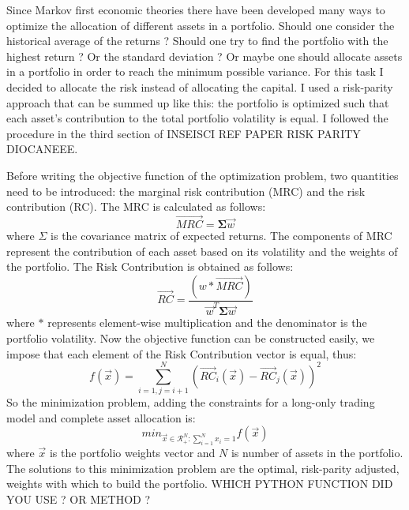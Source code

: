 Since Markov first economic theories there have been developed many ways to optimize the allocation of different assets in a portfolio. Should one consider the historical average of the returns ? Should one try to find the portfolio with the highest return ? Or the standard deviation ? Or maybe one should allocate assets in a portfolio in order to reach the minimum possible variance. For this task I decided to allocate the risk instead of allocating the capital. I used a risk-parity approach that can be summed up like this: the portfolio is optimized such that each asset's contribution to the total portfolio volatility is equal. I followed the procedure in the third section of INSEISCI REF PAPER RISK PARITY DIOCANEEE.

Before writing the objective function of the optimization problem, two quantities need to be introduced: the marginal risk contribution (MRC) and the risk contribution (RC). The MRC is calculated as follows:
\begin{equation}
	\vec{\textit{MRC}} = \mathbf{\Sigma}\vec{w}
\end{equation}
where $\Sigma$ is the covariance matrix of expected returns. The components of MRC represent the contribution of each asset based on its volatility and the weights of the portfolio.
The Risk Contribution is obtained as follows:
\begin{equation}
	\vec{\textit{RC}} = \frac{(w * \vec{\textit{MRC}})}{\Vec{w}^{T}\mathbf{\Sigma}\Vec{w}}
\end{equation}
where $*$ represents element-wise multiplication and the denominator is the portfolio volatility.
Now the objective function can be constructed easily, we impose that each element of the Risk Contribution vector is equal, thus:
\begin{equation}
	f(\vec{x}) = \sum_{i = 1, j = i + 1}^{N} (\vec{\textit{RC}}_i (\vec{x}) - \vec{\textit{RC}}_j (\vec{x}))^2 
	\label{risk-parity-objfunc}
\end{equation}
So the minimization problem, adding the constraints for a long-only trading model and complete asset allocation is:
\begin{equation}
	min_{\vec{x} \in \mathcal{R}^N_{+} : \sum_{i = 1}^{N} x_i = 1} f(\vec{x})
\end{equation}
where $\vec{x}$ is the portfolio weights vector and $N$ is number of assets in the portfolio.
The solutions to this minimization problem are the optimal, risk-parity adjusted, weights with which to build the portfolio. WHICH PYTHON FUNCTION DID YOU USE ? OR METHOD ?
